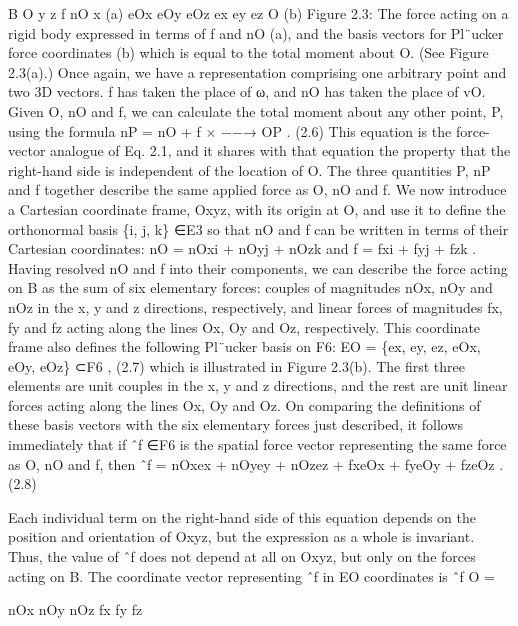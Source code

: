 B O y z f nO x (a) eOx eOy eOz ex ey ez O (b) Figure 2.3: The force acting on a rigid body expressed in terms of f and nO (a), and the basis vectors for Pl¨ucker force coordinates (b) which is equal to the total moment about O. (See Figure 2.3(a).) Once again, we have a representation comprising one arbitrary point and two 3D vectors. f has taken the place of ω, and nO has taken the place of vO. Given O, nO and f, we can calculate the total moment about any other point, P, using the formula nP = nO + f × −−→ OP . (2.6) This equation is the force-vector analogue of Eq. 2.1, and it shares with that equation the property that the right-hand side is independent of the location of O. The three quantities P, nP and f together describe the same applied force as O, nO and f. We now introduce a Cartesian coordinate frame, Oxyz, with its origin at O, and use it to define the orthonormal basis \{i, j, k\} ∈E3 so that nO and f can be written in terms of their Cartesian coordinates: nO = nOxi + nOyj + nOzk and f = fxi + fyj + fzk . Having resolved nO and f into their components, we can describe the force acting on B as the sum of six elementary forces: couples of magnitudes nOx, nOy and nOz in the x, y and z directions, respectively, and linear forces of magnitudes fx, fy and fz acting along the lines Ox, Oy and Oz, respectively. This coordinate frame also defines the following Pl¨ucker basis on F6: EO = \{ex, ey, ez, eOx, eOy, eOz\} ⊂F6 , (2.7) which is illustrated in Figure 2.3(b). The first three elements are unit couples in the x, y and z directions, and the rest are unit linear forces acting along the lines Ox, Oy and Oz. On comparing the definitions of these basis vectors with the six elementary forces just described, it follows immediately that if ˆf ∈F6 is the spatial force vector representing the same force as O, nO and f, then ˆf = nOxex + nOyey + nOzez + fxeOx + fyeOy + fzeOz . (2.8)

Each individual term on the right-hand side of this equation depends on the position and orientation of Oxyz, but the expression as a whole is invariant. Thus, the value of ˆf does not depend at all on Oxyz, but only on the forces acting on B. The coordinate vector representing ˆf in EO coordinates is ˆf O =

nOx nOy nOz fx fy fz

